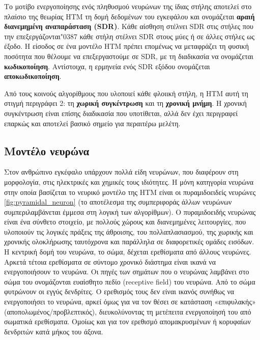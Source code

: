 	Το μοτίβο ενεργοποίησης ενός πληθυσμού νευρώνων της ίδιας στήλης αποτελεί στο πλαίσιο της θεωρίας HTM τη δομή δεδομένων του εγκεφάλου
	και ονομάζεται \textbf{αραιή διανεμημένη αναπαράσταση (SDR)}.
	Κάθε αίσθηση στέλνει SDR στις στήλες που την επεξεργάζονται\char"0387  κάθε στήλη στέλνει SDR στους μύες ή σε άλλες στήλες ως έξοδο.
	Η είσοδος σε ένα μοντέλο HTM πρέπει επομένως να μεταφράζει τη φυσική ποσότητα που θέλουμε να επεξεργαστούμε σε SDR, με τη διαδικασία να ονομάζεται \textbf{κωδικοποίηση}.
	Αντίστοιχα, η ερμηνεία ενός SDR εξόδου ονομάζεται \textbf{αποκωδικοποίηση}.

	Από τους κοινούς αλγορίθμους που υλοποιεί κάθε φλοιική στήλη, η HTM αυτή τη στιγμή περιγράφει 2: τη \textbf{χωρική συγκέντρωση} και τη \textbf{χρονική μνήμη}.
	Η χρονική συγκέντρωση είναι επίσης διαδικασία που υποτίθεται, αλλά δεν έχει περιγραφεί επαρκώς και αποτελεί βασικό σημείο για περαιτέρω μελέτη.


\subsection{Μοντέλο νευρώνα}

Στον ανθρώπινο εγκέφαλο υπάρχουν πολλά είδη νευρώνων, που διαφέρουν στη μορφολογία, στις ηλεκτρικές και χημικές τους ιδιότητες.
Η μόνη κατηγορία νευρώνα στην οποία βασίζεται το νευρικό μοντέλο της HTM είναι οι πυραμιδοειδείς νευρώνες \ref{fig:pyramidal_neuron}
(το αποτέλεσμα της συμπεριφοράς άλλων νευρώνων συμπεριλαμβάνεται έμμεσα στη λογική των αλγορίθμων).
Ο πυραμιδοειδής νευρώνας είναι ένα σύνθετο στοιχείο, με πολλούς χώρους και διανεμημένες λειτουργίες, που υλοποιούν τις λογικές πράξεις της άθροισης,
του πολλαπλασιασμού, της χωρικής και χρονικής ολοκλήρωσης ταυτόχρονα και παράλληλα σε διαφορετικές ομάδες εισόδων.
Η κεντρική δομή του νευρώνα, το σώμα, δέχεται ερεθίσματα από άλλους νευρώνες.
Αρκετά τέτοια ερεθίσματα σε σύντομο χρονικό διάστημα είναι ικανά να ενεργοποιήσουν το νευρώνα.
Οι πηγές των σημάτων που ο νευρώνας λαμβάνει στο σώμα του ονομάζονται ευαίσθητο πεδίο (receptive field) του νευρώνα.
Από το σώμα φυτρώνουν οι εγγύς δενδρίτες. Ο ερεθισμός τους δεν είναι ικανός συνήθως να ενεργοποιήσει το νευρώνα, αρκεί όμως για να τον θέσει
σε κατάσταση «επιφυλακής» (αποπολωμένος/προβλεπτικός), διευκολύνοντας τη μετέπειτα ενεργοποίησή του από σωματικά ερεθίσματα.
Ομοίως και για τον ερεθισμό απομακρυσμένων ή κορυφαίων δενδριτών κατά μήκος του άξονα.

